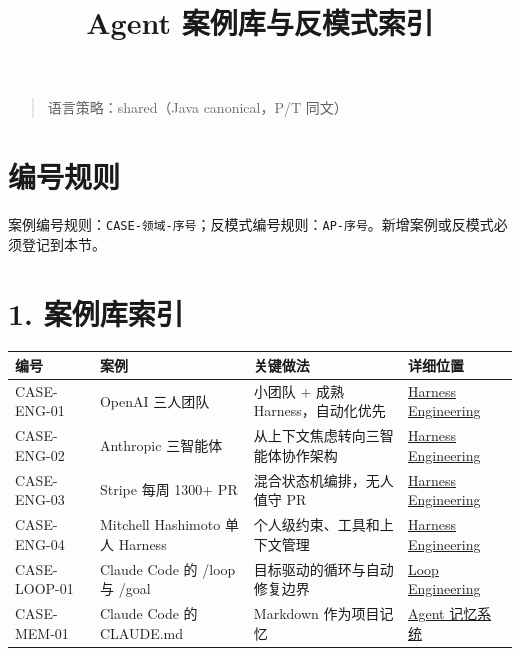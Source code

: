 \documentclass[9pt,a4paper,twocolumn]{ctexart}
\begin{document}
\title{Agent 案例库与反模式索引}
\date{}
\maketitle
{}

\begin{quote}
语言策略：shared（Java canonical，P/T 同文）
\end{quote}



\section*{编号规则}


案例编号规则：\texttt{CASE-领域-序号}；反模式编号规则：\texttt{AP-序号}。新增案例或反模式必须登记到本节。



\section*{1. 案例库索引}

{\footnotesize
\begin{tabular}{|p{}|p{}|p{}|p{}|}
\hline
\textbf{编号} & \textbf{案例} & \textbf{关键做法} & \textbf{详细位置} \\
\hline
CASE-ENG-01 & OpenAI 三人团队 & 小团队 + 成熟 Harness，自动化优先 & \href{../04-工程实践/03-Harness工程.md}{Harness Engineering} \\
\hline
CASE-ENG-02 & Anthropic 三智能体 & 从上下文焦虑转向三智能体协作架构 & \href{../04-工程实践/03-Harness工程.md}{Harness Engineering} \\
\hline
CASE-ENG-03 & Stripe 每周 1300+ PR & 混合状态机编排，无人值守 PR & \href{../04-工程实践/03-Harness工程.md}{Harness Engineering} \\
\hline
CASE-ENG-04 & Mitchell Hashimoto 单人 Harness & 个人级约束、工具和上下文管理 & \href{../04-工程实践/03-Harness工程.md}{Harness Engineering} \\
\hline
CASE-LOOP-01 & Claude Code 的 /loop 与 /goal & 目标驱动的循环与自动修复边界 & \href{../04-工程实践/02-Loop工程.md}{Loop Engineering} \\
\hline
CASE-MEM-01 & Claude Code 的 CLAUDE.md & Markdown 作为项目记忆 & \href{../02-Agent/02-Agent记忆系统.md}{Agent 记忆系统} \\
\hline
\end{tabular}
}
\end{document}

